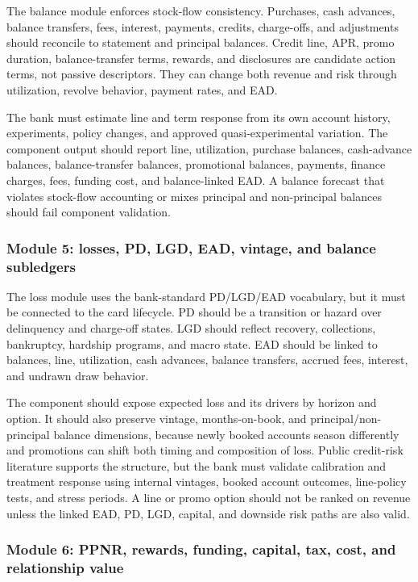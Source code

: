 \documentclass[11pt]{article}
\newcommand{\1}{\mathbf{1}}
\begin{document}
The balance module enforces stock-flow consistency. Purchases, cash advances,
balance transfers, fees, interest, payments, credits, charge-offs, and
adjustments should reconcile to statement and principal balances. Credit line,
APR, promo duration, balance-transfer terms, rewards, and disclosures are
candidate action terms, not passive descriptors. They can change both revenue
and risk through utilization, revolve behavior, payment rates, and EAD.

The bank must estimate line and term response from its own account history,
experiments, policy changes, and approved quasi-experimental variation. The
component output should report line, utilization, purchase balances,
cash-advance balances, balance-transfer balances, promotional balances,
payments, finance charges, fees, funding cost, and balance-linked EAD. A
balance forecast that violates stock-flow accounting or mixes principal and
non-principal balances should fail component validation.

\subsubsection{Module 5: losses, PD, LGD, EAD, vintage, and balance subledgers}
\label{subsec:module-losses}

The loss module uses the bank-standard PD/LGD/EAD vocabulary, but it must be
connected to the card lifecycle. PD should be a transition or hazard over
delinquency and charge-off states. LGD should reflect recovery, collections,
bankruptcy, hardship programs, and macro state. EAD should be linked to
balances, line, utilization, cash advances, balance transfers, accrued fees,
interest, and undrawn draw behavior.

The component should expose expected loss and its drivers by horizon and
option. It should also preserve vintage, months-on-book, and
principal/non-principal balance dimensions, because newly booked accounts
season differently and promotions can shift both timing and composition of
loss. Public credit-risk literature supports the structure, but the bank must
validate calibration and treatment response using internal vintages, booked
account outcomes, line-policy tests, and stress periods. A line or promo
option should not be ranked on revenue unless the linked EAD, PD, LGD, capital,
and downside risk paths are also valid.

\subsubsection{Module 6: PPNR, rewards, funding, capital, tax, cost, and relationship value}
\label{subsec:module-ppnr}
\end{document}
